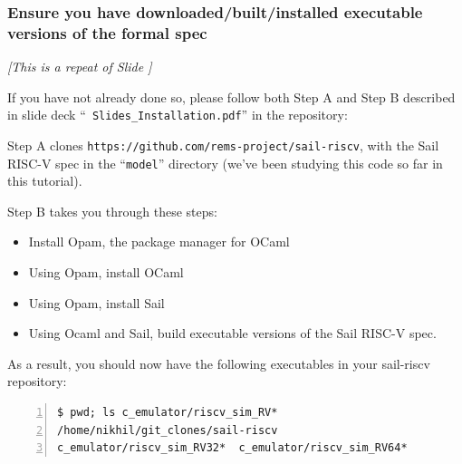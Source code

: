 \documentclass[aspectratio=169]{beamer}
\newcommand{\hmm}{\hspace*{2em}}
\newcommand{\slidefont}{\scriptsize}
\begin{document}
\begin{frame}[fragile]
  \frametitle{Ensure you have downloaded/built/installed executable versions of the formal spec}

  \slidefont

  \emph{[This is a repeat of Slide \pageref{reminder-download-install}]}

  If you have not already done so, please follow both Step A and Step B described in slide deck ``{\tt
    Slides\_Installation.pdf}'' in the repository:

  \vspace{1ex}

  \hmm {\tt https://github.com/rsnikhil/RISCV\_ISA\_Spec\_Tour}

  \vspace{1ex}

  Step A clones {\tt https://github.com/rems-project/sail-riscv}, with
  the Sail RISC-V spec in the ``{\tt model}'' directory (we've been
  studying this code so far in this tutorial).

  \vspace{1ex}

  Step B takes you through these steps:
  \begin{itemize}
  \item Install Opam, the package manager for OCaml
  \item Using Opam, install OCaml
  \item Using Opam, install Sail
  \item Using Ocaml and Sail, build executable versions of the Sail RISC-V spec.
  \end{itemize}

  As a result, you should now have the following executables in your sail-riscv repository:

  \vspace{1ex}

  \begin{Verbatim}[frame=single, numbers=left, label = in your sail-riscv repository clone]
$ pwd; ls c_emulator/riscv_sim_RV*
/home/nikhil/git_clones/sail-riscv
c_emulator/riscv_sim_RV32*  c_emulator/riscv_sim_RV64*
  \end{Verbatim}

\end{frame}

\end{document}
